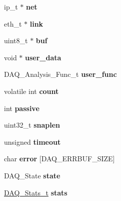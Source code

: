 \begin{DoxyCompactItemize}
\item 
\hypertarget{struct_nfq_impl_a3f1c7df396b4ef4efd83b63874f1d8f1}{
ip\_\-t $\ast$ {\bfseries net}}
\label{struct_nfq_impl_a3f1c7df396b4ef4efd83b63874f1d8f1}

\item 
\hypertarget{struct_nfq_impl_a6ec83f3a2694a1f9b2d275dc568fe547}{
eth\_\-t $\ast$ {\bfseries link}}
\label{struct_nfq_impl_a6ec83f3a2694a1f9b2d275dc568fe547}

\item 
\hypertarget{struct_nfq_impl_aa93f4c2d0eae1af37f397cda38b95168}{
uint8\_\-t $\ast$ {\bfseries buf}}
\label{struct_nfq_impl_aa93f4c2d0eae1af37f397cda38b95168}

\item 
\hypertarget{struct_nfq_impl_a5bb82691fb3ff19970bfb007d08b73a2}{
void $\ast$ {\bfseries user\_\-data}}
\label{struct_nfq_impl_a5bb82691fb3ff19970bfb007d08b73a2}

\item 
\hypertarget{struct_nfq_impl_a0b3dc36b4f46964e710444ca4e288ab0}{
DAQ\_\-Analysis\_\-Func\_\-t {\bfseries user\_\-func}}
\label{struct_nfq_impl_a0b3dc36b4f46964e710444ca4e288ab0}

\item 
\hypertarget{struct_nfq_impl_a40fdf158f43c44dbcab587f819434c11}{
volatile int {\bfseries count}}
\label{struct_nfq_impl_a40fdf158f43c44dbcab587f819434c11}

\item 
\hypertarget{struct_nfq_impl_a9ac2cae1eaa337067f45fb797e51c485}{
int {\bfseries passive}}
\label{struct_nfq_impl_a9ac2cae1eaa337067f45fb797e51c485}

\item 
\hypertarget{struct_nfq_impl_afb849c1f28e89eff6ef3f8b1a81d7eff}{
uint32\_\-t {\bfseries snaplen}}
\label{struct_nfq_impl_afb849c1f28e89eff6ef3f8b1a81d7eff}

\item 
\hypertarget{struct_nfq_impl_a342da58a47422226da80eb72d6549cce}{
unsigned {\bfseries timeout}}
\label{struct_nfq_impl_a342da58a47422226da80eb72d6549cce}

\item 
\hypertarget{struct_nfq_impl_a522d58431509b6f87006bca4ba571b3d}{
char {\bfseries error} \mbox{[}DAQ\_\-ERRBUF\_\-SIZE\mbox{]}}
\label{struct_nfq_impl_a522d58431509b6f87006bca4ba571b3d}

\item 
\hypertarget{struct_nfq_impl_a4dae42c2099abec1d9843204ad6849ab}{
DAQ\_\-State {\bfseries state}}
\label{struct_nfq_impl_a4dae42c2099abec1d9843204ad6849ab}

\item 
\hypertarget{struct_nfq_impl_adf3bfa1fd27a8611109ecdcbd3f76405}{
\hyperlink{struct__daq__stats}{DAQ\_\-Stats\_\-t} {\bfseries stats}}
\label{struct_nfq_impl_adf3bfa1fd27a8611109ecdcbd3f76405}

\end{DoxyCompactItemize}



